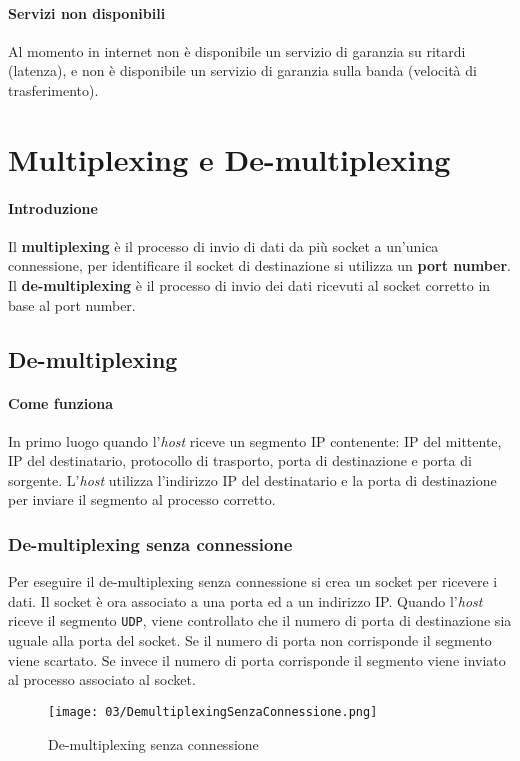     \paragraph{Servizi non disponibili} Al momento in internet non è disponibile un servizio di garanzia su ritardi (latenza), e non è disponibile un servizio di garanzia sulla banda (velocità di trasferimento).
\section{Multiplexing e De-multiplexing}
    \paragraph{Introduzione} Il \textbf{multiplexing} è il processo di invio di dati da più socket a un'unica connessione, per identificare il socket di destinazione si utilizza un \textbf{port number}. Il \textbf{de-multiplexing} è il processo di invio dei dati ricevuti al socket corretto in base al port number.
    \subsection{De-multiplexing}
        \paragraph{Come funziona} In primo luogo quando l'\textit{host} riceve un segmento IP contenente: IP del mittente, IP del destinatario, protocollo di trasporto, porta di destinazione e porta di sorgente. L'\textit{host} utilizza l'indirizzo IP del destinatario e la porta di destinazione per inviare il segmento al processo corretto.
        \subsubsection{De-multiplexing senza connessione}
            Per eseguire il de-multiplexing senza connessione si crea un socket per ricevere i dati. Il socket è ora associato a una porta ed a un indirizzo IP. Quando l'\textit{host} riceve il segmento \texttt{UDP}, viene controllato che il numero di porta di destinazione sia uguale alla porta del socket. Se il numero di porta non corrisponde il segmento viene scartato. Se invece il numero di porta corrisponde il segmento viene inviato al processo associato al socket.
            \begin{figure}[H]
                \centering
                \texttt{[image: 03/DemultiplexingSenzaConnessione.png]}
                \caption{De-multiplexing senza connessione}
            \end{figure}

